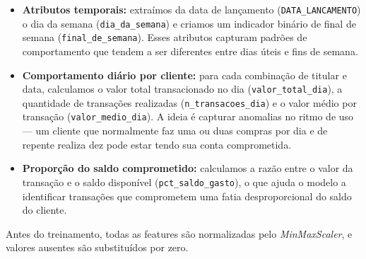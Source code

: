 \begin{itemize}
    \item \textbf{Atributos temporais:} extraímos da data de lançamento (\texttt{DATA\_LANCAMENTO}) o dia da semana (\texttt{dia\_da\_semana}) e criamos um indicador binário de final de semana (\texttt{final\_de\_semana}). Esses atributos capturam padrões de comportamento que tendem a ser diferentes entre dias úteis e fins de semana.

    \item \textbf{Comportamento diário por cliente:} para cada combinação de titular e data, calculamos o valor total transacionado no dia (\texttt{valor\_total\_dia}), a quantidade de transações realizadas (\texttt{n\_transacoes\_dia}) e o valor médio por transação (\texttt{valor\_medio\_dia}). A ideia é capturar anomalias no ritmo de uso --- um cliente que normalmente faz uma ou duas compras por dia e de repente realiza dez pode estar tendo sua conta comprometida.

    \item \textbf{Proporção do saldo comprometido:} calculamos a razão entre o valor da transação e o saldo disponível (\texttt{pct\_saldo\_gasto}), o que ajuda o modelo a identificar transações que comprometem uma fatia desproporcional do saldo do cliente.
\end{itemize}

Antes do treinamento, todas as features são normalizadas pelo \textit{MinMaxScaler}, e valores ausentes são substituídos por zero.

